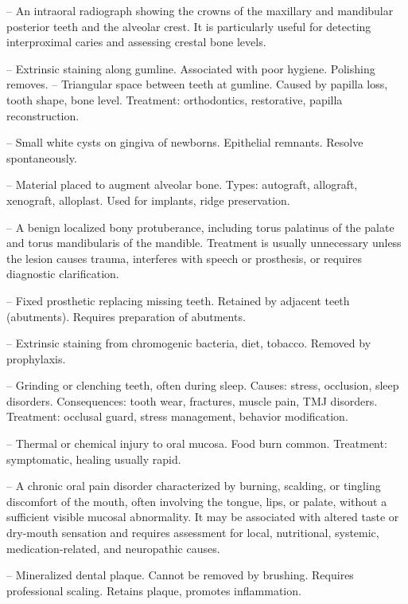 -- An intraoral radiograph showing the crowns of the maxillary and mandibular posterior teeth and the alveolar crest. It is particularly useful for detecting interproximal caries and assessing crestal bone levels.

-- Extrinsic staining along gumline. Associated with poor hygiene. Polishing removes.
-- Triangular space between teeth at gumline. Caused by papilla loss, tooth shape, bone level. Treatment: orthodontics, restorative, papilla reconstruction.

-- Small white cysts on gingiva of newborns. Epithelial remnants. Resolve spontaneously.

-- Material placed to augment alveolar bone. Types: autograft, allograft, xenograft, alloplast. Used for implants, ridge preservation.

-- A benign localized bony protuberance, including torus palatinus of the palate and torus mandibularis of the mandible. Treatment is usually unnecessary unless the lesion causes trauma, interferes with speech or prosthesis, or requires diagnostic clarification.

-- Fixed prosthetic replacing missing teeth. Retained by adjacent teeth (abutments). Requires preparation of abutments.

-- Extrinsic staining from chromogenic bacteria, diet, tobacco. Removed by prophylaxis.

-- Grinding or clenching teeth, often during sleep. Causes: stress, occlusion, sleep disorders. Consequences: tooth wear, fractures, muscle pain, TMJ disorders. Treatment: occlusal guard, stress management, behavior modification.

-- Thermal or chemical injury to oral mucosa. Food burn common. Treatment: symptomatic, healing usually rapid.

-- A chronic oral pain disorder characterized by burning, scalding, or tingling discomfort of the mouth, often involving the tongue, lips, or palate, without a sufficient visible mucosal abnormality. It may be associated with altered taste or dry-mouth sensation and requires assessment for local, nutritional, systemic, medication-related, and neuropathic causes.

-- Mineralized dental plaque. Cannot be removed by brushing. Requires professional scaling. Retains plaque, promotes inflammation.

